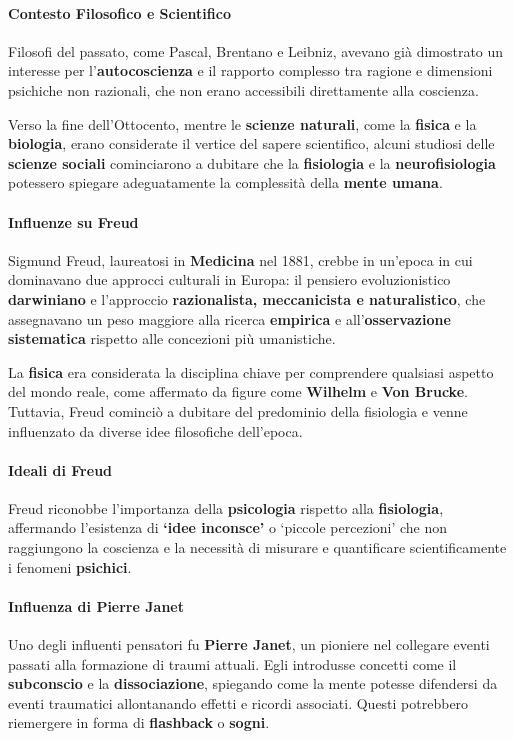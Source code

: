 \documentclass{subfiles}
\begin{document}
\paragraph*{Contesto Filosofico e Scientifico}
Filosofi del passato, come Pascal, Brentano e Leibniz, avevano già dimostrato un interesse per 
l'\textbf{autocoscienza} e il rapporto complesso tra ragione e dimensioni psichiche non 
razionali, che non erano accessibili direttamente alla coscienza.

Verso la fine dell'Ottocento, mentre le \textbf{scienze naturali}, come la \textbf{fisica} e la 
\textbf{biologia}, erano considerate il vertice del sapere scientifico, alcuni studiosi delle 
\textbf{scienze sociali} cominciarono a dubitare che la \textbf{fisiologia} e la 
\textbf{neurofisiologia} potessero spiegare adeguatamente la complessità della \textbf{mente umana}.\\ 

\paragraph*{Influenze su Freud}
Sigmund Freud, laureatosi in \textbf{Medicina} nel 1881, crebbe in un'epoca in cui dominavano 
due approcci culturali in Europa: il pensiero evoluzionistico \textbf{darwiniano} e 
l'approccio \textbf{razionalista, meccanicista e naturalistico}, che assegnavano un peso 
maggiore alla ricerca \textbf{empirica} e all'\textbf{osservazione sistematica} rispetto alle 
concezioni più umanistiche. 

La \textbf{fisica} era considerata la disciplina chiave per comprendere qualsiasi aspetto 
del mondo reale, come affermato da figure come \textbf{Wilhelm} e \textbf{Von Brucke}. 
Tuttavia, Freud cominciò a dubitare del predominio della fisiologia e venne influenzato 
da diverse idee filosofiche dell'epoca.\\

\paragraph*{Ideali di Freud}
Freud riconobbe l'importanza della \textbf{psicologia} rispetto alla \textbf{fisiologia}, 
affermando l'esistenza di \textbf{`idee inconsce'} o `piccole percezioni' che non raggiungono 
la coscienza e la necessità di misurare e quantificare scientificamente i fenomeni \textbf{psichici}.\\

\paragraph*{Influenza di Pierre Janet}
Uno degli influenti pensatori fu \textbf{Pierre Janet}, un pioniere nel collegare eventi 
passati alla formazione di traumi attuali. Egli introdusse concetti come il \textbf{subconscio} 
e la \textbf{dissociazione}, spiegando come la mente potesse difendersi da eventi traumatici 
allontanando effetti e ricordi associati. 
Questi potrebbero riemergere in forma di \textbf{flashback} o \textbf{sogni}.\\
\end{document}
